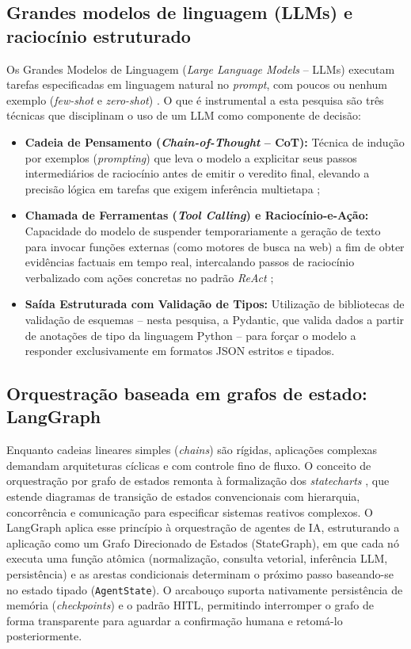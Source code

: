 \subsection{Grandes modelos de linguagem (LLMs) e raciocínio estruturado}
Os Grandes Modelos de Linguagem (\textit{Large Language Models} -- LLMs) executam tarefas especificadas em linguagem natural no \textit{prompt}, com poucos ou nenhum exemplo (\textit{few-shot} e \textit{zero-shot}) \cite{brown2020language}. O que é instrumental a esta pesquisa são três técnicas que disciplinam o uso de um LLM como componente de decisão:
\begin{itemize}
	\item \textbf{Cadeia de Pensamento (\textit{Chain-of-Thought} -- CoT):} Técnica de indução por exemplos (\textit{prompting}) que leva o modelo a explicitar seus passos intermediários de raciocínio antes de emitir o veredito final, elevando a precisão lógica em tarefas que exigem inferência multietapa \cite{wei2022chain};
	\item \textbf{Chamada de Ferramentas (\textit{Tool Calling}) e Raciocínio-e-Ação:} Capacidade do modelo de suspender temporariamente a geração de texto para invocar funções externas (como motores de busca na web) a fim de obter evidências factuais em tempo real, intercalando passos de raciocínio verbalizado com ações concretas no padrão \textit{ReAct} \cite{yao2023react};
	\item \textbf{Saída Estruturada com Validação de Tipos:} Utilização de bibliotecas de validação de esquemas -- nesta pesquisa, a Pydantic, que valida dados a partir de anotações de tipo da linguagem Python \cite{pydantic2025docs} -- para forçar o modelo a responder exclusivamente em formatos JSON estritos e tipados.
\end{itemize}

\subsection{Orquestração baseada em grafos de estado: LangGraph}
Enquanto cadeias lineares simples (\textit{chains}) são rígidas, aplicações complexas demandam arquiteturas cíclicas e com controle fino de fluxo. O conceito de orquestração por grafo de estados remonta à formalização dos \textit{statecharts} \cite{harel1987statecharts}, que estende diagramas de transição de estados convencionais com hierarquia, concorrência e comunicação para especificar sistemas reativos complexos. O LangGraph \cite{langchain2024langgraph} aplica esse princípio à orquestração de agentes de IA, estruturando a aplicação como um Grafo Direcionado de Estados (StateGraph), em que cada nó executa uma função atômica (normalização, consulta vetorial, inferência LLM, persistência) e as arestas condicionais determinam o próximo passo baseando-se no estado tipado (\texttt{AgentState}). O arcabouço suporta nativamente persistência de memória (\textit{checkpoints}) e o padrão HITL, permitindo interromper o grafo de forma transparente para aguardar a confirmação humana e retomá-lo posteriormente.

